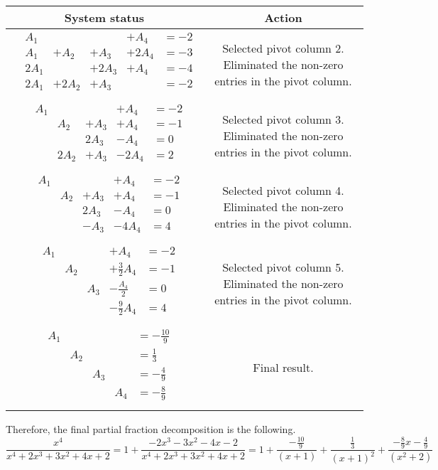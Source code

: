 {\begin{longtable}{cc} System status & Action \\\hline $\begin{array}{llllll} & A_{1} & & & +A_{4} & =-2\\ & A_{1} & +A_{2} & +A_{3} & +2A_{4} & =-3\\ & 2A_{1} & & +2A_{3} & +A_{4} & =-4\\ & 2A_{1} & +2A_{2} & +A_{3} & & =-2\\\end{array}$& Selected pivot column 2. Eliminated the non-zero entries in the pivot column. \\\hline $\begin{array}{llllll} & A_{1} & & & +A_{4} & =-2\\ & & A_{2} & +A_{3} & +A_{4} & =-1\\ & & & 2A_{3} & -A_{4} & =0\\ & & 2A_{2} & +A_{3} & -2A_{4} & =2\\\end{array}$& Selected pivot column 3. Eliminated the non-zero entries in the pivot column. \\\hline $\begin{array}{llllll} & A_{1} & & & +A_{4} & =-2\\ & & A_{2} & +A_{3} & +A_{4} & =-1\\ & & & 2A_{3} & -A_{4} & =0\\ & & & -A_{3} & -4A_{4} & =4\\\end{array}$& Selected pivot column 4. Eliminated the non-zero entries in the pivot column. \\\hline $\begin{array}{llllll} & A_{1} & & & +A_{4} & =-2\\ & & A_{2} & & +\frac{3}{2}A_{4} & =-1\\ & & & A_{3} & -\frac{A_{4} }{2} & =0\\ & & & & -\frac{9}{2}A_{4} & =4\\\end{array}$& Selected pivot column 5. Eliminated the non-zero entries in the pivot column. \\\hline $\begin{array}{llllll} & A_{1} & & & & =-\frac{10}{9}\\ & & A_{2} & & & =\frac{1}{3}\\ & & & A_{3} & & =-\frac{4}{9}\\ & & & & A_{4} & =-\frac{8}{9}\\\end{array}$& Final result.\\ \end{longtable}Therefore, the final partial fraction decomposition is the following. \[\frac{x^{4}}{x^{4}+2x^{3}+3x^{2}+4x +2}=1+ \frac{-2x^{3}-3x^{2}-4x -2}{x^{4}+2x^{3}+3x^{2}+4x +2}=1+ \frac{-\frac{10}{9}}{(x +1)}+\frac{\frac{1}{3}}{(x +1)^{2}}+\frac{-\frac{8}{9}x -\frac{4}{9}}{(x^{2}+2)}\]

}
